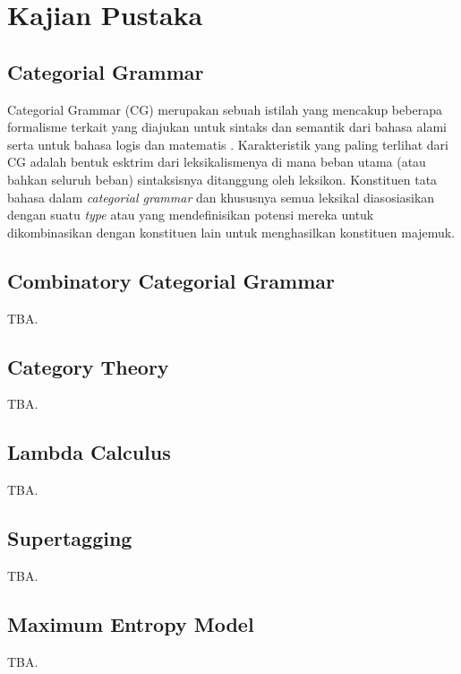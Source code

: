 \chapter{Kajian Pustaka}

\section{Categorial Grammar}
Categorial Grammar (CG) merupakan sebuah istilah yang mencakup beberapa formalisme terkait yang diajukan
untuk sintaks dan semantik dari bahasa alami serta untuk bahasa logis dan matematis \cite{Steedman92catg}.
Karakteristik yang paling terlihat dari CG adalah bentuk esktrim dari leksikalismenya di mana beban utama
(atau bahkan seluruh beban) sintaksisnya ditanggung oleh leksikon.
Konstituen tata bahasa dalam \textit{categorial grammar} dan khususnya semua leksikal diasosiasikan
dengan suatu \textit{type} atau  yang mendefinisikan potensi mereka untuk
dikombinasikan dengan konstituen lain untuk menghasilkan konstituen majemuk.

\section{Combinatory Categorial Grammar}
TBA.


\section{Category Theory}
TBA.


\section{Lambda Calculus}
TBA.


\section{Supertagging}
TBA.


\section{Maximum Entropy Model}
TBA.



